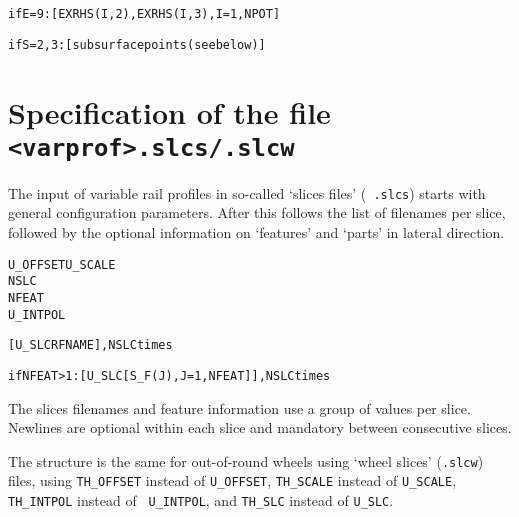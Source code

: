 \documentclass[12pt]{report}
\renewcommand{\magenta}[1]{}
\begin{document}
\begin{alltt}
if E=9: [ EXRHS(I,2), EXRHS(I,3), I=1,NPOT    ]

% Subsurface stress calculation (section \ref{sec:subsurf}):

if S=2,3: [ subsurface points (see below) ]
\end{alltt}

\section{Specification of the file {\tt <varprof>.slcs/.slcw}}
\label{sec:spec_slcs}

The input of variable rail profiles in so-called `slices files' ({\tt
.slcs}) starts with general configuration parameters. After this follows
the list of filenames per slice, followed by the optional information on
`features' and `parts' in lateral direction\magenta{\ and information on
surface perturbations}.

\begin{alltt}\small
% General parameters and counters

U_OFFSET   U_SCALE
NSLC
NFEAT     \magenta{\{NKINK\}      \{NACCEL\}}
U_INTPOL  \magenta{\{PERTURB\}}

% Slice positions and filenames per slice

[ U_SLC     RFNAME ],  NSLC times

% Feature information per slice

\magenta{if NKINK >0:  [ P_KINK(J),  J=1,NKINK    ]
if NACCEL>0:  [ P_ACCEL(J), J=1,NACCEL   ]
}if NFEAT >1:  [ U_SLC  [ S_F(J), J=1,NFEAT ] ],  NSLC times\magenta{

if PERTURB=1:   NTERM
              [ AMPL     WAVEL      UPHASE   ],  NTERM times
if PERTURB=2:   NTERM
              [ AMPL     NORDER     TPHASE   ],  NTERM times}
\end{alltt}
\magenta{Keywords for kinks and accelerations are introduced for a future
extension. The positions of kinks and accelerations are entered each as one
`group of values'. They may be presented on a single line of input or may
be separated by newlines as discussed in Section \ref{sec:inputfile}.}

The slices filenames and feature information use a group of values
per slice. Newlines are optional within each slice and mandatory between
consecutive slices. 

The structure is the same for out-of-round wheels using `wheel slices'
({\tt .slcw}) files, using {\tt TH\_\-OFF\-SET} instead of {\tt U\_OFFSET},
{\tt TH\_SCALE} instead of {\tt U\_SCALE}, {\tt TH\_INTPOL} instead of {\tt
U\_INTPOL}, and {\tt TH\_SLC} instead of {\tt U\_SLC}.
\end{document}
